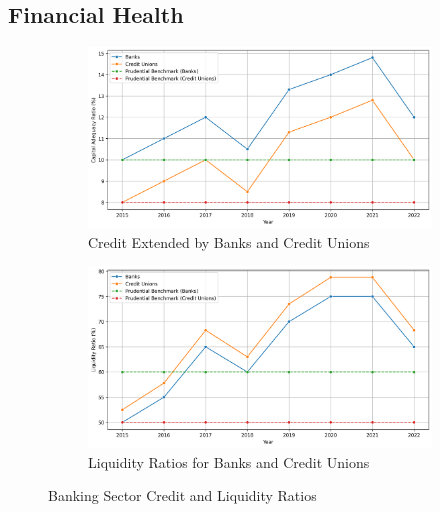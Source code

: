 
\newpage
 

\subsection*{Financial Health}

\begin{figure}[h]
    \centering
    \begin{subfigure}{0.48\textwidth}
        \centering
        \includegraphics[width=\textwidth]{Benchmarks.png}
        \caption{\small Credit Extended by Banks and Credit Unions}
        \label{fig:benchmarks}
    \end{subfigure}
    \hfill
    \begin{subfigure}{0.48\textwidth}
        \centering
        \includegraphics[width=\textwidth]{liquidity_ratio.png}
        \caption{\small Liquidity Ratios for Banks and Credit Unions}
        \label{fig:liquidity_ratios}
    \end{subfigure}
    \caption{Banking Sector Credit and Liquidity Ratios}  %
    \label{fig:credit_liquidity}
\end{figure}



